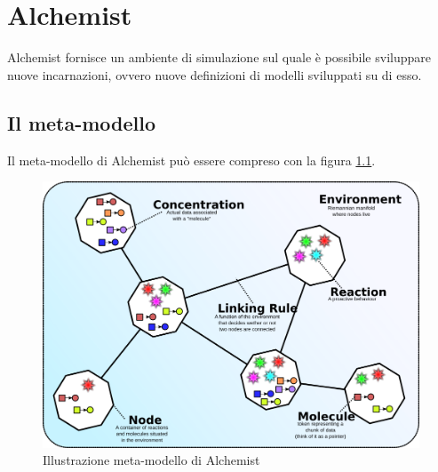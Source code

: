 \documentclass[12pt,a4paper,openright,twoside]{report}
\begin{document}
\clearpage{\pagestyle{empty}\cleardoublepage}

\listoffigures

\clearpage{\pagestyle{empty}\cleardoublepage}


\clearpage{\pagestyle{empty}\cleardoublepage}

 \lstlistoflistings

\chapter{Alchemist}
\lhead[\fancyplain{}{\bfseries\thepage}]{\fancyplain{}{\bfseries\rightmark}}
Alchemist fornisce un ambiente di simulazione sul quale \`e possibile sviluppare nuove incarnazioni, ovvero nuove definizioni di modelli sviluppati su di esso.

\section{Il meta-modello}
Il meta-modello di Alchemist pu\`o essere compreso con la figura \ref{fig:alchemistModel}.
\begin{figure}[h] %
\begin{center} %
\includegraphics[width=12.5cm]{images/model.png} %
\caption[Illustrazione meta-modello di Alchemist]{Illustrazione meta-modello di Alchemist} \label{fig:alchemistModel}
\end{center}
\end{figure}
\end{document}
